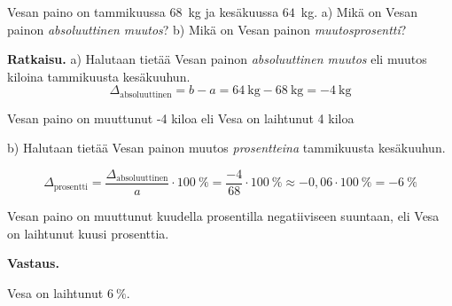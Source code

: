 \begin{esimerkki}
    Vesan paino on tammikuussa $68$~kg ja kesäkuussa $64$~kg.
    \newline a) Mikä on Vesan painon \textit{absoluuttinen muutos}?
    \newline b) Mikä on Vesan painon \textit{muutosprosentti}?
    
    \textbf{Ratkaisu.}
a) Halutaan tietää Vesan painon \textit{absoluuttinen muutos} eli muutos kiloina tammikuusta kesäkuuhun.
    \[
       \Delta_{\text{absoluuttinen}} = b - a = 64~\text{kg} - 68~\text{kg} = -4~\text{kg}
    \]

    Vesan paino on muuttunut -4 kiloa eli Vesa on laihtunut 4 kiloa

b) Halutaan tietää Vesan painon muutos \textit{prosentteina} tammikuusta kesäkuuhun.
    
    \[
        \Delta_{\text{prosentti}}
        = \frac{\Delta_{\text{absoluuttinen}}}{a} \cdot 100~\%
        = \frac{-4}{68} \cdot 100~\%
        \approx -0,06 \cdot 100~\%
        = -6~\% 
    \]
    
    Vesan paino on muuttunut kuudella prosentilla negatiiviseen suuntaan,
    eli Vesa on laihtunut kuusi prosenttia.
    
    \textbf{Vastaus.}
    
    Vesa on laihtunut $6~\%$.
\end{esimerkki}

    

